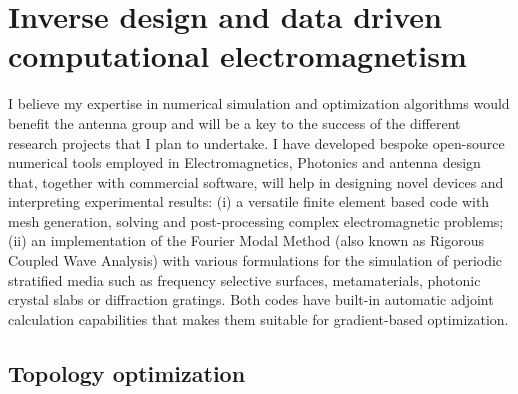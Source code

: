 \documentclass[11pt]{academia}
\begin{document}
\section{Inverse design and data driven computational electromagnetism}

I believe my expertise in numerical simulation and optimization algorithms 
would benefit the antenna group and will be a key to the success of the 
different research projects that I plan to undertake. I have developed bespoke 
open-source numerical tools employed in Electromagnetics, Photonics 
and antenna design that, together with commercial software, will help in 
designing novel devices and interpreting experimental results: 
(i) a versatile finite element based code\autocite{gyptis} with mesh generation, solving and post-processing 
complex electromagnetic problems; (ii) an 
implementation of the Fourier Modal Method\autocite{nannos} (also known as Rigorous Coupled Wave Analysis) 
with various formulations for the simulation of periodic stratified media 
such as frequency selective surfaces, metamaterials, photonic crystal slabs 
or diffraction gratings. 
Both codes have built-in automatic adjoint calculation capabilities 
that makes them suitable for gradient-based optimization.



\subsection{Topology optimization}
% 
\end{document}
